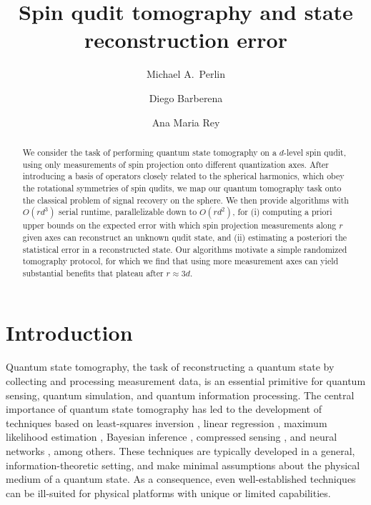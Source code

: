 \documentclass[nofootinbib,twocolumn]{revtex4-1}
\newcommand{\p}[1]{\left(#1\right)} %
\begin{document}
\title{Spin qudit tomography and state reconstruction error}
\author{Michael A.~Perlin}
\author{Diego Barberena}
\author{Ana Maria Rey}


\begin{abstract}
We consider the task of performing quantum state tomography on a $d$-level spin qudit, using only measurements of spin projection onto different quantization axes.
After introducing a basis of operators closely related to the spherical harmonics, which obey the rotational symmetries of spin qudits, we map our quantum tomography task onto the classical problem of signal recovery on the sphere.
We then provide algorithms with $O\p{rd^3}$ serial runtime, parallelizable down to $O\p{rd^2}$, for (i) computing a priori upper bounds on the expected error with which spin projection measurements along $r$ given axes can reconstruct an unknown qudit state, and (ii) estimating a posteriori the statistical error in a reconstructed state.
Our algorithms motivate a simple randomized tomography protocol, for which we find that using more measurement axes can yield substantial benefits that plateau after $r\approx3d$.
\end{abstract}

\maketitle

\section{Introduction}

Quantum state tomography, the task of reconstructing a quantum state by collecting and processing measurement data, is an essential primitive for quantum sensing, quantum simulation, and quantum information processing.
The central importance of quantum state tomography has led to the development of techniques based on least-squares inversion \cite{opatrny1997leastsquares}, linear regression \cite{qi2013quantum}, maximum likelihood estimation \cite{teo2011quantumstate, smolin2012efficient}, Bayesian inference \cite{huszar2012adaptive, ferrie2014quantum, granade2016practical}, compressed sensing \cite{gross2010quantum, kalev2015quantum}, and neural networks \cite{torlai2018neuralnetwork}, among others.
These techniques are typically developed in a general, information-theoretic setting, and make minimal assumptions about the physical medium of a quantum state.
As a consequence, even well-established techniques can be ill-suited for physical platforms with unique or limited capabilities.
\end{document}
